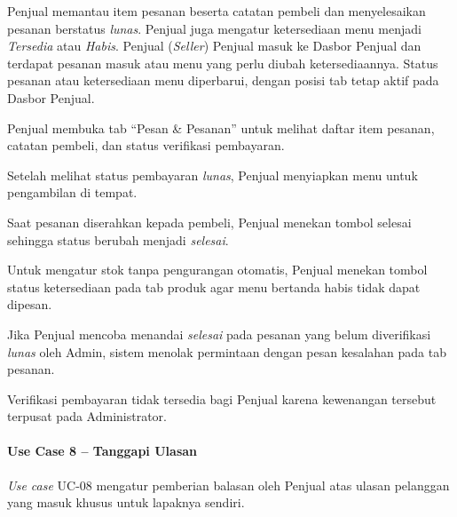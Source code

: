 {Penjual memantau item pesanan beserta catatan pembeli dan menyelesaikan pesanan berstatus \textit{lunas}. Penjual juga mengatur ketersediaan menu menjadi \textit{Tersedia} atau \textit{Habis}.}
{Penjual (\textit{Seller})}
{Penjual masuk ke Dasbor Penjual dan terdapat pesanan masuk atau menu yang perlu diubah ketersediaannya.}
{Status pesanan atau ketersediaan menu diperbarui, dengan posisi tab tetap aktif pada Dasbor Penjual.}
{\begin{uclist}
  \item Penjual membuka tab ``Pesan \& Pesanan'' untuk melihat daftar item pesanan, catatan pembeli, dan status verifikasi pembayaran.
  \item Setelah melihat status pembayaran \textit{lunas}, Penjual menyiapkan menu untuk pengambilan di tempat.
  \item Saat pesanan diserahkan kepada pembeli, Penjual menekan tombol selesai sehingga status berubah menjadi \textit{selesai}.
  \item Untuk mengatur stok tanpa pengurangan otomatis, Penjual menekan tombol status ketersediaan pada tab produk agar menu bertanda habis tidak dapat dipesan.
\end{uclist}}
{\begin{ucbullet}
  \item Jika Penjual mencoba menandai \textit{selesai} pada pesanan yang belum diverifikasi \textit{lunas} oleh Admin, sistem menolak permintaan dengan pesan kesalahan pada tab pesanan.
  \item Verifikasi pembayaran tidak tersedia bagi Penjual karena kewenangan tersebut terpusat pada Administrator.
\end{ucbullet}}

\paragraph{Use Case 8 -- Tanggapi Ulasan}
\textit{Use case} UC-08 mengatur pemberian balasan oleh Penjual atas ulasan pelanggan yang masuk khusus untuk lapaknya sendiri.

